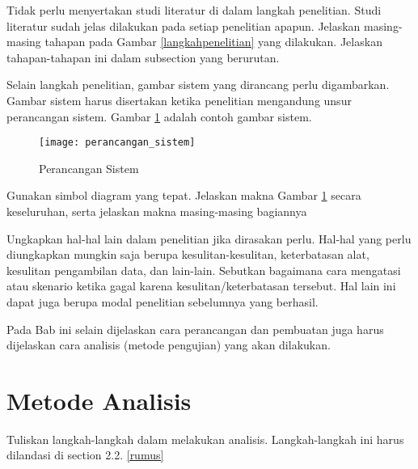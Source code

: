 	Tidak perlu menyertakan studi literatur di dalam langkah penelitian. Studi literatur sudah jelas dilakukan pada setiap penelitian apapun. Jelaskan masing-masing tahapan pada Gambar \ref{langkahpenelitian} yang dilakukan. Jelaskan tahapan-tahapan ini dalam subsection yang berurutan.
	
	Selain langkah penelitian, gambar sistem yang dirancang perlu digambarkan. Gambar sistem harus disertakan ketika penelitian mengandung unsur perancangan sistem. Gambar \ref{perancagansistem} adalah contoh gambar sistem.
	\begin{figure}
		\centering
		\texttt{[image: perancangan\_sistem]}
		\caption{Perancangan Sistem}
		\label{perancagansistem}
	\end{figure}
	
	Gunakan simbol diagram yang tepat. Jelaskan makna Gambar \ref{perancagansistem} secara keseluruhan, serta jelaskan makna masing-masing bagiannya
	
	Ungkapkan hal-hal lain dalam penelitian jika dirasakan perlu. Hal-hal yang perlu diungkapkan mungkin saja berupa kesulitan-kesulitan, keterbatasan alat, kesulitan pengambilan data, dan lain-lain. Sebutkan bagaimana cara mengatasi atau skenario ketika gagal karena kesulitan/keterbatasan tersebut. Hal lain ini dapat juga berupa modal penelitian sebelumnya yang berhasil.
	
	Pada Bab ini selain dijelaskan cara perancangan dan pembuatan juga harus dijelaskan cara analisis (metode pengujian) yang akan dilakukan.
	
	\section{Metode Analisis}
	Tuliskan langkah-langkah dalam melakukan analisis. Langkah-langkah ini harus dilandasi di section 2.2. \ref{rumus}